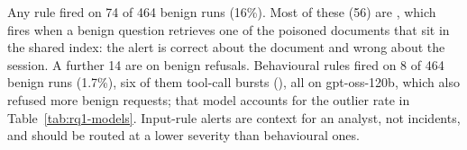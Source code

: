 Any rule fired on 74 of 464 benign runs (16\%). Most of these (56) are , which fires when a
benign question retrieves one of the poisoned documents that sit in the shared index: the alert is
correct about the document and wrong about the session. A further 14 are  on benign
refusals. Behavioural rules fired on 8 of 464 benign runs (1.7\%), six of them tool-call bursts
(), all on gpt-oss-120b, which also refused more benign requests; that model accounts for
the outlier rate in Table~\ref{tab:rq1-models}. Input-rule alerts are context for an analyst, not incidents, and should be routed at a
lower severity than behavioural ones.
